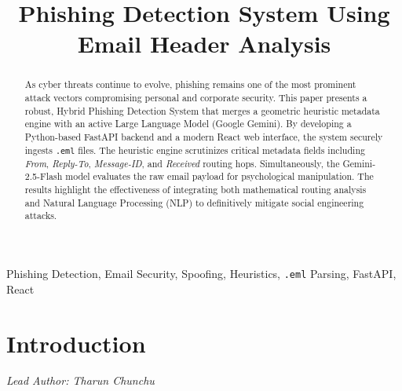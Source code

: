 \documentclass[conference]{IEEEtran}
\begin{document}
\title{Phishing Detection System Using Email Header Analysis}

\author{
\and
{}
\and
{}
}

\maketitle

\begin{abstract}
As cyber threats continue to evolve, phishing remains one of the most prominent attack vectors compromising personal and corporate security. This paper presents a robust, Hybrid Phishing Detection System that merges a geometric heuristic metadata engine with an active Large Language Model (Google Gemini). By developing a Python-based FastAPI backend and a modern React web interface, the system securely ingests \texttt{.eml} files. The heuristic engine scrutinizes critical metadata fields including \textit{From}, \textit{Reply-To}, \textit{Message-ID}, and \textit{Received} routing hops. Simultaneously, the Gemini-2.5-Flash model evaluates the raw email payload for psychological manipulation. The results highlight the effectiveness of integrating both mathematical routing analysis and Natural Language Processing (NLP) to definitively mitigate social engineering attacks.
\end{abstract}

\begin{IEEEkeywords}
Phishing Detection, Email Security, Spoofing, Heuristics, \texttt{.eml} Parsing, FastAPI, React
\end{IEEEkeywords}

\section{Introduction}
\textit{Lead Author: Tharun Chunchu}
\end{document}
